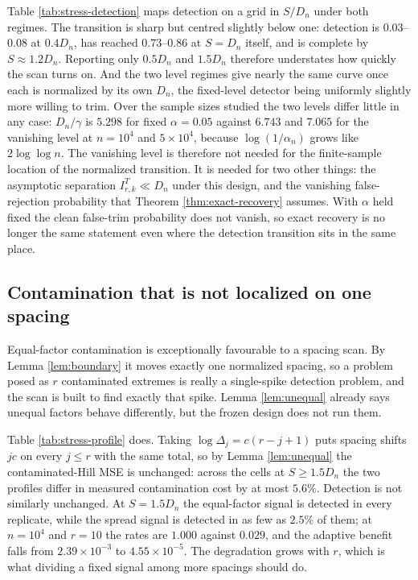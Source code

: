 \documentclass[11pt]{article}
\begin{document}
Table \ref{tab:stress-detection} maps detection on a grid in $S/D_n$ under both
regimes.  The transition is sharp but centred slightly below one: detection is $0.03$--$0.08$ at $0.4D_n$, has reached $0.73$--$0.86$
at $S=D_n$ itself, and is complete by $S\approx1.2D_n$.  Reporting only
$0.5D_n$ and $1.5D_n$ therefore understates how quickly the scan turns on.  And
the two level regimes give nearly the same curve once each is normalized by its
own $D_n$, the fixed-level detector being uniformly slightly more willing to
trim.  Over the sample sizes studied the two levels differ little in any case:
$D_n/\gamma$ is $5.298$ for fixed $\alpha=0.05$ against $6.743$ and $7.065$ for
the vanishing level at $n=10^4$ and $5\times10^4$, because $\log(1/\alpha_n)$
grows like $2\log\log n$.  The vanishing level is therefore not needed for the
finite-sample location of the normalized transition.  It is needed for two
other things: the asymptotic separation $I^{T}_{r,k}\ll D_n$ under this design,
and the vanishing false-rejection probability that Theorem
\ref{thm:exact-recovery} assumes.  With $\alpha$ held fixed the clean
false-trim probability does not vanish, so exact recovery is no longer the same
statement even where the detection transition sits in the same place.



\subsection{Contamination that is not localized on one spacing}

Equal-factor contamination is exceptionally favourable to a spacing scan.  By
Lemma \ref{lem:boundary} it moves exactly one normalized spacing, so a problem
posed as $r$ contaminated extremes is really a single-spike detection problem,
and the scan is built to find exactly that spike.  Lemma \ref{lem:unequal}
already says unequal factors behave differently, but the frozen design does not
run them.

Table \ref{tab:stress-profile} does.  Taking $\log\Delta_j=c(r-j+1)$ puts
spacing shifts $jc$ on every $j\le r$ with the same total, so by Lemma
\ref{lem:unequal} the contaminated-Hill MSE is unchanged: across the cells at
$S\ge1.5D_n$ the two profiles differ in measured contamination cost by at most
$5.6\%$.  Detection is not similarly unchanged.  At $S=1.5D_n$ the
equal-factor signal is detected in every replicate, while the spread signal is
detected in as few as $2.5\%$ of them; at $n=10^4$ and $r=10$ the rates are
$1.000$ against $0.029$, and the adaptive benefit falls from
$2.39\times10^{-3}$ to $4.55\times10^{-5}$.  The degradation grows with $r$,
which is what dividing a fixed signal among more spacings should do.
\end{document}
